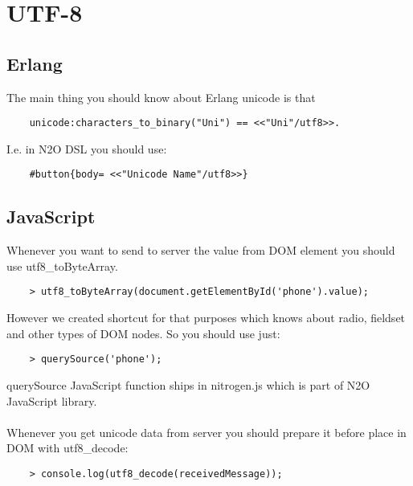 \section{UTF-8}

\subsection{Erlang}

The main thing you should know about Erlang unicode is that

\vspace{1\baselineskip}
\begin{lstlisting}
    unicode:characters_to_binary("Uni") == <<"Uni"/utf8>>.
\end{lstlisting}
\vspace{1\baselineskip}

I.e. in N2O DSL you should use:

\vspace{1\baselineskip}
\begin{lstlisting}
    #button{body= <<"Unicode Name"/utf8>>}
\end{lstlisting}
\vspace{1\baselineskip}

\subsection{JavaScript}

Whenever you want to send to server the value from DOM element
you should use utf8\_toByteArray.

\vspace{1\baselineskip}
\begin{lstlisting}
    > utf8_toByteArray(document.getElementById('phone').value);
\end{lstlisting}
\vspace{1\baselineskip}

However we created shortcut for that purposes which knows
about radio, fieldset and other types of DOM nodes. So you should use just:

\vspace{1\baselineskip}
\begin{lstlisting}
    > querySource('phone');
\end{lstlisting}
\vspace{1\baselineskip}

querySource JavaScript function ships in nitrogen.js which is part
of N2O JavaScript library.

\paragraph{}
Whenever you get unicode data from server you should prepare it before place
in DOM with utf8\_decode:

\vspace{1\baselineskip}
\begin{lstlisting}
    > console.log(utf8_decode(receivedMessage));
\end{lstlisting}
\vspace{1\baselineskip}
